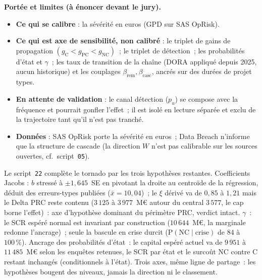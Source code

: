 \documentclass[11pt,a4paper]{article}
\begin{document}
\begin{portee}
\textbf{Portée et limites (à énoncer devant le jury).}
\begin{itemize}[leftmargin=1.4em,itemsep=1pt,topsep=2pt]
\item \textbf{Ce qui se calibre} : la sévérité en euros (GPD sur SAS OpRisk).
\item \textbf{Ce qui est axe de sensibilité, non calibré} : le triplet de gains de propagation
  $(g_{\text{C}}<g_{\text{PC}}<g_{\text{NC}})$~; le triplet de détection~; les probabilités
  d'état et $\gamma$~; les taux de transition de la chaîne (DORA appliqué depuis 2025, aucun
  historique) et les couplages $\beta_{\text{rem}},\beta_{\text{casc}}$, ancrés sur des durées
  de projet types.
\item \textbf{En attente de validation} : le canal détection ($p_u$) se compose avec la
  fréquence et pourrait gonfler l'effet~; il est isolé en lecture séparée et exclu de la
  trajectoire tant qu'il n'est pas tranché.
\item \textbf{Données} : SAS OpRisk porte la sévérité en euros~; Data Breach n'informe que la
  structure de cascade (la direction $W$ n'est pas calibrable sur les sources ouvertes,
  cf.~script~\texttt{05}).
\end{itemize}
\end{portee}

Le script~\texttt{22} complète le tornado par les trois hypothèses restantes. Coefficients
Jacobs : $b$ stressé à $\pm 1{,}645$~SE en pivotant la droite au centroïde de la régression,
déduit des erreurs-types publiées ($\bar{x} = 10{,}04$)~; le $\xi$ dérivé va de $0{,}85$ à
$1{,}21$ mais le Delta PRC reste contenu ($3\,125$ à $3\,977$~M\euro{} autour du central
$3\,577$, le cap borne l'effet)~: axe d'hypothèse dominant du périmètre PRC, verdict intact.
$\gamma$~: le SCR espéré normal est invariant par construction ($10\,644$~M\euro, la
marginale redonne l'ancrage)~; seule la bascule en crise durcit
($\mathrm{P}(\text{NC} \mid \text{crise})$ de $84$ à $100\,\%$). Ancrage des probabilités
d'état~: le capital espéré actuel va de $9\,951$ à $11\,485$~M\euro{} selon les enquêtes
retenues, le SCR par état et le surcoût NC contre C restant inchangés (conditionnels à
l'état). Trois axes, même ligne de partage~: les hypothèses bougent des niveaux, jamais la
direction ni le classement.
\end{document}
